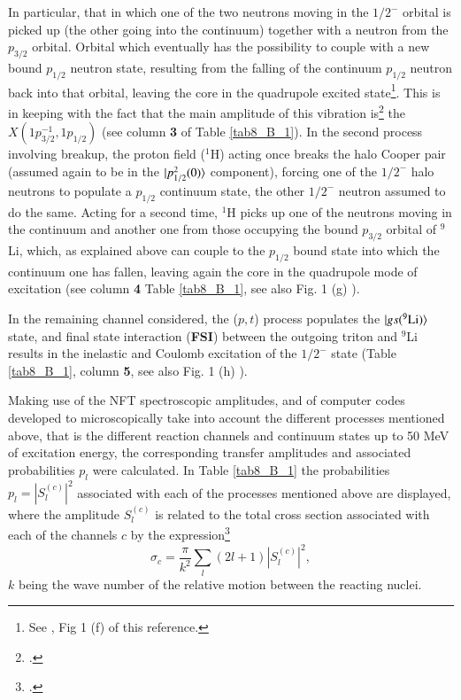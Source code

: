  
  In particular, that in which one of the two neutrons moving in the $1/2^-$ orbital is picked up (the other going into the continuum) together with a neutron from the $p_{3/2}$ orbital. Orbital which eventually has the possibility to couple with a new bound $p_{1/2}$ neutron state, resulting from the falling of the continuum $p_{1/2}$ neutron back into that orbital, leaving the core in the quadrupole excited state\footnote{See  \cite{Potel:10}, Fig 1 (f) of this reference.}. This is in keeping with the fact that the main amplitude of this vibration is\footnote{\cite{Barranco:01}.} the  $X(1p^{-1}_{3/2},1p_{1/2})$ (see column \textbf{3} of Table \ref{tab8_B_1}). In the second process involving breakup, the proton field ($^1$H) acting once breaks the halo Cooper pair (assumed again to be in the $|{p_{1/2}^2(0)} \rangle$ component), forcing one of the $1/2^-$ halo neutrons to populate a $p_{1/2}$ continuum state, the other $1/2^-$ neutron assumed to do the same. Acting for a second time, $^1$H picks up one of the neutrons moving in the continuum and another one from those occupying the bound $p_{3/2}$ orbital of $^{9}$Li,  which, as explained above can couple to the $p_{1/2}$ bound state into which the continuum one has fallen, leaving again the core in the quadrupole mode of excitation (see column \textbf{4} Table \ref{tab8_B_1}, see also Fig. 1 (g) \cite{Potel:10}). 
 
  In the remaining channel considered, the ($p,t$) process populates the  $|{gs(^{9}\text{Li})} \rangle$ state, and final state interaction (\textbf{FSI}) between the outgoing triton and $^{9}$Li results in the inelastic and Coulomb excitation of  the $1/2^-$ state (Table \ref{tab8_B_1}, column \textbf{5}, see also Fig. 1 (h) \cite{Potel:10}).
 
 
 Making use of the NFT spectroscopic amplitudes, and of computer codes developed  to microscopically take into account the different processes mentioned above, that is the different reaction channels and continuum states up to 50 MeV of excitation energy, the corresponding transfer amplitudes and associated probabilities $p_l$ were calculated.
 In Table \ref{tab8_B_1}  the probabilities $p_l=|S_l^{(c)}|^2$ associated with each of the processes mentioned above are displayed, where the amplitude $S_l^{(c)}$ is related to the total cross section associated with each of the channels $c$  by the expression\footnote{\cite{Satchler:80,Landau:81}.}
 \begin{equation}\label{eq6B1}
 \sigma_c=\frac{\pi}{k^2}\sum_l(2l+1)|S_l^{(c)}|^2,
 \end{equation}
 $k$ being the wave number of the relative motion between the reacting nuclei.
 
